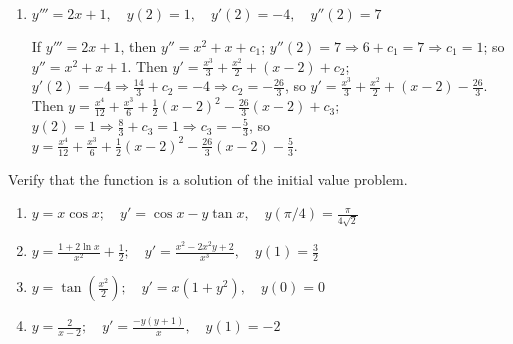 \documentclass{ximera}
\begin{document}
\begin{problem}
\begin{enumerate}
\item %
$y'''=2x+1, \quad y(2)=1, \quad
y'(2)=-4, \quad y''(2)=7$



\begin{solution}
    If $y'''=2x+1$, then $y''=x^2+x+c_1$; $y''(2)=7\Rightarrow
6+c_1=7\Rightarrow c_1=1$; so $y''=x^2+x+1$. Then $y'=\frac{x^3}{3}+\frac{x^2}{2}+(x-2)+c_2$; $y'(2)=-4\Rightarrow \frac{14}{3}+c_2=-4\Rightarrow c_2=-\frac{26}{3}$, so $y'=\frac{x^3}{3}+\frac{x^2}{2}+(x-2)-\frac{26}{3}$. Then $y=\frac{x^4}{12}+\frac{x^3}{6}+\frac{1}{2}(x-2)^2-\frac{26}{3}(x-2)+c_3$;
$y(2)=1\Rightarrow \frac{8}{3}+c_3=1\Rightarrow c_3=-\frac{5}{3}$, so $y=\frac{x^4}{12}+\frac{x^3}{6}+\frac{1}{2} (x-2)^2-\frac{26}{3}
(x-2)-\frac{5}{3}$.
\end{solution}
\end{enumerate}
\end{problem}

\begin{problem}\label{exer:1.2.5}
Verify that the  function is a solution of
the initial value problem.

\begin{enumerate}
\item %
$y=x\cos x;     \quad y'=\cos x-y\tan x, \quad
y(\pi/4)=\frac{\pi}{4\sqrt{2}}$

\item %
$y=\frac{1+2\ln x}{ x^2}+\frac{1}{2};     \quad
y'=\frac{x^2-2x^2y+2}{ x^3},   \quad y(1)=\frac{3}{2}$

\item %
$y=\tan\left(\frac{x^2}{2}\right);
\quad y'=x(1+y^2),   \quad y(0)=0$

\item %
$y=\frac{2}{ x-2};     \quad y'=\frac{-y(y+1)}{ x}, \quad
y(1)=-2$
\end{enumerate}
\end{problem}
\end{document}
